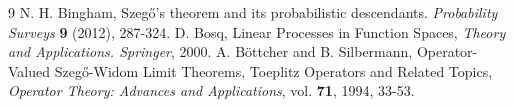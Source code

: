 \documentclass[11pt]{article}
\begin{document}
\begin{thebibliography}{9}
 N. H. Bingham, Szeg\H{o}'s theorem and its probabilistic descendants.  {\sl Probability Surveys} {\bf 9} (2012), 287-324.
 D. Bosq, Linear Processes in Function Spaces, {\sl Theory and Applications. Springer}, 2000.
 A. B\"ottcher and B. Silbermann, Operator-Valued Szeg\H{o}-Widom Limit Theorems, Toeplitz Operators and Related Topics, {\sl Operator Theory: Advances and Applications}, vol. {\bf 71}, 1994, 33-53.

\end{thebibliography}
\end{document}
